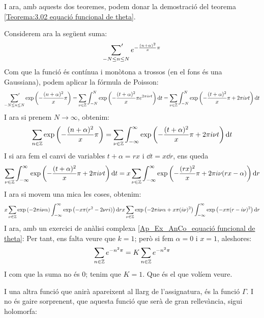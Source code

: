 I ara, amb aquests dos teoremes, podem donar la demostració del teorema \ref{Teorema:3.02 equació funcional de theta}.
\begin{pf}
    Considerem ara la següent suma:
    \[
    \sideset{}{'}\sum_{-N\leq n\leq N}e^{-\frac{(n+\alpha)^2}{x}\pi}
    \]
    Com que la funció és contínua i monòtona a trossos (en el fons és una Gaussiana), podem aplicar la fórmula de Poisson:
    \[
    \sideset{}{'}\sum_{-N\leq n\leq N}\exp\left({-\frac{(n+\alpha)^2}{x}\pi}\right)=
    \sum_{\nu \in \mathbb Z}\int_{-N}^N\exp\left({-\frac{(t+\alpha)^2}{x}\pi}e^{2\pi i \nu t}\right)\mathrm{d} t=
    \sum_{\nu \in \mathbb Z}\int_{-N}^N\exp\left({-\frac{(t+\alpha)^2}{x}\pi+2\pi i \nu t}\right)\mathrm{d} t
    \]
    I ara si prenem $N\rightarrow \infty$, obtenim:
    \[
    \sum_{n\in\mathbb Z}\exp\left(-\frac{(n+\alpha)^2}{x}\pi\right)=
    \sum_{\nu \in \mathbb Z}\int_{-\infty}^\infty \exp\left(-\frac{(t+\alpha)^2}{x}\pi+2\pi i \nu t\right)\mathrm{d} t
    \]
    I si ara fem el canvi de variables $t+\alpha=r x$ i $\dd t=x\dd r$, ens queda
    \[
        \sum_{\nu \in \mathbb Z}\int_{-\infty}^\infty \exp\left(-\frac{(t+\alpha)^2}{x}\pi+2\pi i \nu t\right)\mathrm{d} t=
        x\sum_{\nu \in \mathbb Z}\int_{-\infty}^\infty \exp\left(-\frac{(rx)^2}{x}\pi+2\pi i \nu(rx-\alpha)\right)\mathrm{d} r
    \]
    I ara si movem una mica les coses, obtenim:
    \[
        x\sum_{\nu \in \mathbb Z}\exp\left(-2\pi i \nu\alpha\right)\int_{-\infty}^\infty \exp\left(-x\pi(r^2-2\nu ri)\right)\mathrm{d} r
        x\sum_{\nu \in \mathbb Z}\exp\left(-2\pi i \nu\alpha+x\pi(i\nu)^2\right)\int_{-\infty}^\infty \exp\left(-x\pi(r-i\nu)^2\right)\mathrm{d} r
    \]
    I ara, amb un exercici de anàlisi complexa \ref{Ap_Ex_AnCo_equació funcional de theta}:
    Per tant, ens falta veure que $k=1$; però si fem $\alpha=0$ i $x=1$, aleshores:
    \[
        \sum_{n\in\mathbb Z}e^{-n^2 \pi}=K\sum_{n\in\mathbb Z}e^{-n^2\pi}
    \]
    I com que la suma no és 0; tenim que $K=1$. Que és el que volíem veure.
\end{pf}
I una altra funció que anirà apareixent al llarg de l'assignatura, és la funció $\Gamma$.
I no és gaire sorprenent, que aquesta funció que serà de gran rellevància, sigui holomorfa:

